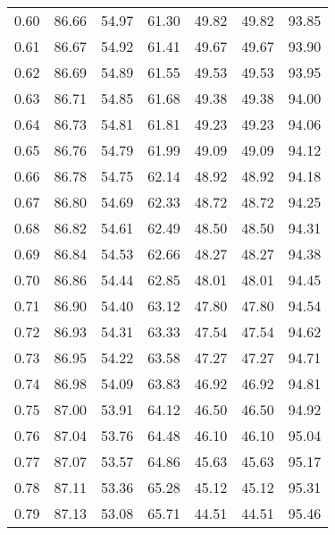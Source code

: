 \begin{tabular}{|c|c|c|c|c|c|c|}
      0.60 &     86.66 &     54.97 &      61.30 &   49.82 &      49.82 &         93.85 \\
      0.61 &     86.67 &     54.92 &      61.41 &   49.67 &      49.67 &         93.90 \\
      0.62 &     86.69 &     54.89 &      61.55 &   49.53 &      49.53 &         93.95 \\
      0.63 &     86.71 &     54.85 &      61.68 &   49.38 &      49.38 &         94.00 \\
      0.64 &     86.73 &     54.81 &      61.81 &   49.23 &      49.23 &         94.06 \\
      0.65 &     86.76 &     54.79 &      61.99 &   49.09 &      49.09 &         94.12 \\
      0.66 &     86.78 &     54.75 &      62.14 &   48.92 &      48.92 &         94.18 \\
      0.67 &     86.80 &     54.69 &      62.33 &   48.72 &      48.72 &         94.25 \\
      0.68 &     86.82 &     54.61 &      62.49 &   48.50 &      48.50 &         94.31 \\
      0.69 &     86.84 &     54.53 &      62.66 &   48.27 &      48.27 &         94.38 \\
      0.70 &     86.86 &     54.44 &      62.85 &   48.01 &      48.01 &         94.45 \\
      0.71 &     86.90 &     54.40 &      63.12 &   47.80 &      47.80 &         94.54 \\
      0.72 &     86.93 &     54.31 &      63.33 &   47.54 &      47.54 &         94.62 \\
      0.73 &     86.95 &     54.22 &      63.58 &   47.27 &      47.27 &         94.71 \\
      0.74 &     86.98 &     54.09 &      63.83 &   46.92 &      46.92 &         94.81 \\
      0.75 &     87.00 &     53.91 &      64.12 &   46.50 &      46.50 &         94.92 \\
      0.76 &     87.04 &     53.76 &      64.48 &   46.10 &      46.10 &         95.04 \\
      0.77 &     87.07 &     53.57 &      64.86 &   45.63 &      45.63 &         95.17 \\
      0.78 &     87.11 &     53.36 &      65.28 &   45.12 &      45.12 &         95.31 \\
      0.79 &     87.13 &     53.08 &      65.71 &   44.51 &      44.51 &         95.46 \\

\end{tabular}
